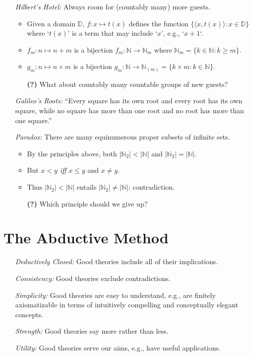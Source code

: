 \documentclass[a4paper, 11pt]{article} %
\newcommand{\tuple}[1]{\langle#1\rangle} %
\newcommand{\set}[1]{\lbrace#1\rbrace} %
\newcommand{\abs}[1]{|#1|} %
\newcommand{\N}{\mathbb{N}}
\newcommand{\D}{\mathbb{D}}
\begin{document}
\begin{enumerate}
  \item[\it Hilbert's Hotel:] Always room for (countably many) more guests.
    \begin{itemize}[leftmargin=-.2in]
      \item Given a domain $\D$, $f:x\mapsto t(x)$ defines the function $\set{\tuple{x,t(x)}:x\in\D}$ where `$t(x)$' is a term that may include `$x$', e.g., `$x+1$`.
      \item $f_m:n\mapsto n+m$ is a bijection $f_m : \N \to \N_m$ where $\N_m=\set{k \in \N : k\geq m}$.
      \item $g_m:n\mapsto n\times m$ is a bijection $g_m : \N \to \N_{(m)}=\set{k\times m: k \in \N}$.
      \item[\bf (?)] What about countably many countable groups of new guests?
    \end{itemize}
  \item[\it Galileo's Roots:] ``Every square has its own root and every root has its own square, while no square has more than one root and no root has more than one square.'' 
  \item[\it Paradox:] There are many equinumerous proper subsets of infinite sets.
    \begin{itemize}[leftmargin=-.2in]
      \item By the principles above, both $\abs{\N_2}<\abs{\N}$ and $\abs{\N_2}=\abs{\N}$.
      \item But $x < y$ \textit{iff} $x \leq y$ and $x \neq y$.
      \item Thus $\abs{\N_2}<\abs{\N}$ entails $\abs{\N_2} \neq \abs{\N}$: contradiction.
      \item[\bf (?)] Which principle should we give up? 
    \end{itemize}
\end{enumerate}



\section*{The Abductive Method}

\begin{enumerate}
  \item[\it Deductively Closed:] Good theories include all of their implications.
  \item[\it Consistency:] Good theories exclude contradictions.
  \item[\it Simplicity:] Good theories are easy to understand, e.g., are finitely axiomatizable in terms of intuitively compelling and conceptually elegant concepts.
  \item[\it Strength:] Good theories say more rather than less.
  \item[\it Utility:] Good theories serve our aims, e.g., have useful applications.
\end{enumerate}
\end{document}
